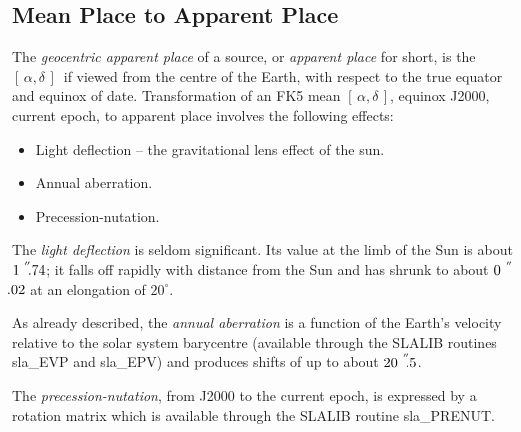 \documentclass[11pt,twoside,nolof]{starlink}
\providecommand{\radec}     {$[\,\alpha,\delta\,]$}
\providecommand{\arcsec}[2] {\arcseci{#1}$\hspace{-0.4em}.#2$}
\providecommand{\arcseci}[1] {$#1\hspace{-0.05em}$\raisebox{-0.5ex}
                         {$^{'\hspace{-0.1em}'}$}}
\begin{document}
\subsection {Mean Place to Apparent Place}
The \textit{geocentric apparent place}\/ of a source, or \textit{apparent place}\/
for short,
is the \radec\ if viewed from the centre of the Earth,
with respect to the true equator and equinox of date.
Transformation of an FK5 mean \radec, equinox J2000,
current epoch, to apparent place involves the following effects:
\goodbreak
\begin{itemize}
   \item Light deflection -- the gravitational lens effect of
         the sun.
   \item Annual aberration.
   \item Precession-nutation.
\end{itemize}
The \textit{light deflection}\/ is seldom significant.  Its value
at the limb of the Sun is about
\arcsec{1}{74};  it falls off rapidly with distance from the
Sun and has shrunk to about
\arcsec{0}{02} at an elongation of $20^\circ$.

As already described, the \textit{annual aberration}\/
is a function of the Earth's velocity
relative to the solar system barycentre (available through the
SLALIB routines
sla\_EVP and
sla\_EPV)
and produces shifts of up to about \arcsec{20}{5}.

The \textit{precession-nutation}, from J2000 to the current epoch, is
expressed by a rotation matrix which is available through the
SLALIB routine
sla\_PRENUT.
\end{document}
